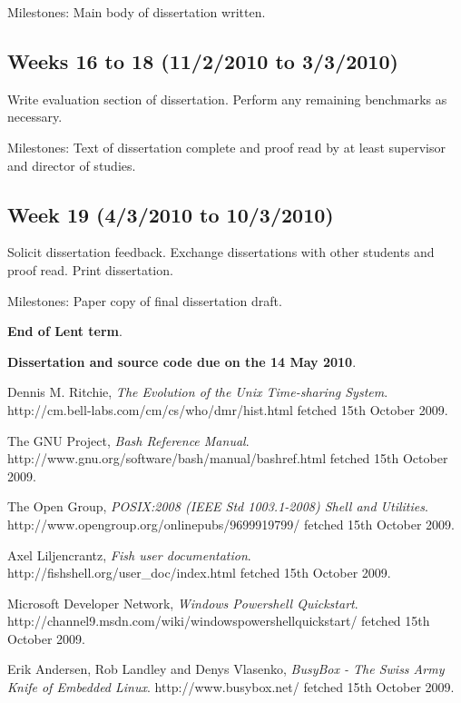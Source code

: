 \documentclass[12pt]{article}
\begin{document}
Milestones: Main body of dissertation written.

\subsection*{Weeks 16 to 18 (11/2/2010 to 3/3/2010)}
Write evaluation section of dissertation. Perform any remaining
benchmarks as necessary.

Milestones: Text of dissertation complete and proof read by at
least supervisor and director of studies.

\subsection*{Week 19 (4/3/2010 to 10/3/2010)}
Solicit dissertation feedback. Exchange dissertations with other
students and proof read. Print dissertation.

Milestones: Paper copy of final dissertation draft.

{\bf End of Lent term}.

{\bf Dissertation and source code due on the 14 May 2010}.


\begin{thebibliography}{9} %

  Dennis M. Ritchie,
  \emph{The Evolution of the Unix Time-sharing System}.
  http://cm.bell-labs.com/cm/cs/who/dmr/hist.html fetched 15th October
  2009.

  The GNU Project,
  \emph{Bash Reference Manual}.
  http://www.gnu.org/software/bash/manual/bashref.html fetched 15th
  October 2009.
 
  The Open Group,
  \emph{POSIX:2008 (IEEE Std 1003.1-2008) Shell and Utilities}.
  http://www.opengroup.org/onlinepubs/9699919799/ fetched 15th October
  2009.

  Axel Liljencrantz,
  \emph{Fish user documentation}.
  http://fishshell.org/user\_doc/index.html fetched 15th October 2009.

  Microsoft Developer Network,
  \emph{Windows Powershell Quickstart}.
  http://channel9.msdn.com/wiki/windowspowershellquickstart/ fetched
  15th October 2009.

  Erik Andersen, Rob Landley and Denys Vlasenko,
  \emph{BusyBox - The Swiss Army Knife of Embedded Linux}.
  http://www.busybox.net/ fetched 15th October 2009.

\end{thebibliography}
\end{document}
